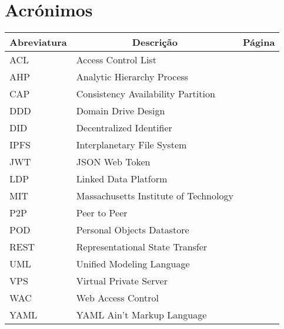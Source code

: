 

\chapter[Glossary]{Acrónimos}

\begin{center}
\small
\begin{longtable}{lp{3.0in}c}
\toprule \multicolumn{1}{c}{Abreviatura}
                & \multicolumn{1}{c}{Descrição}
                                & \multicolumn{1}{c}{Página}\\ \midrule\addlinespace[2pt] \endhead

\bottomrule\endfoot

ACL & Access Control List & \pageref{sym:ACL} \\
AHP & Analytic Hierarchy Process & \pageref{sym:AHP} \\
CAP & Consistency Availability Partition & \pageref{sym:cap} \\
DDD & Domain Drive Design & \pageref{sym:DDD} \\
DID & Decentralized Identifier & \pageref{sym:DID} \\
IPFS & Interplanetary File System & \pageref{sym:IPFS} \\
JWT & JSON Web Token & \pageref{sym:jwt} \\
LDP & Linked Data Platform & \pageref{sym:LDP} \\
MIT & Massachusetts Institute of Technology & \pageref{sym:MIT} \\
P2P & Peer to Peer & \pageref{sym:P2P} \\
POD & Personal Objects Datastore & \pageref{sym:POD} \\
REST & Representational State Transfer & \pageref{sym:REST} \\
UML & Unified Modeling Language & \pageref{sym:UML} \\
VPS & Virtual Private Server & \pageref{sym:vps} \\
WAC & Web Access Control & \pageref{sym:WAC} \\
YAML & YAML Ain't Markup Language & \pageref{sym:YAML}

\end{longtable}

\end{center}

